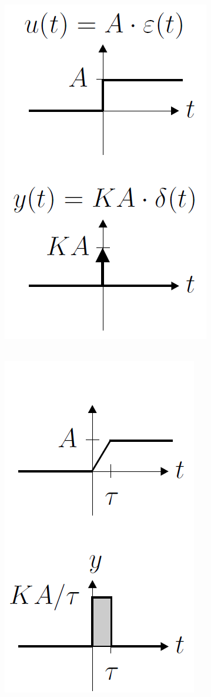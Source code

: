 \begin{minipage}{0.25\columnwidth} 
    \center 
      \\
    \includegraphics[width=0.65\columnwidth]{images/D-glied_ideal}
\end{minipage}
\hfill
\begin{minipage}{0.25\columnwidth}
    \center 
     \\
    \includegraphics[width=0.6\columnwidth]{images/D-glied_real}
\end{minipage}
